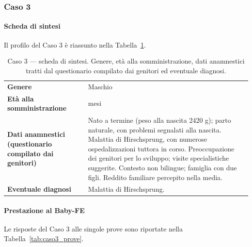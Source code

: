  \subsubsection*{Caso 3}

 \paragraph*{Scheda di sintesi}

Il profilo del Caso 3 è riassunto nella Tabella~\ref{tab:caso3_scheda}.

\begin{table}[htbp]
\centering
\caption[Caso 3 --- scheda di sintesi]{Caso 3 --- scheda di sintesi. Genere, età alla somministrazione, dati anamnestici tratti dal questionario compilato dai genitori ed eventuale diagnosi.}
\label{tab:caso3_scheda}
\begin{tabular}{|>{\raggedright\arraybackslash}p{4.3cm}|>{\raggedright\arraybackslash}p{9.2cm}|}
\toprule
\textbf{Genere} & Maschio \\
\textbf{Età alla somministrazione} & 31 mesi \\
\textbf{Dati anamnestici (questionario compilato dai genitori)} & Nato a termine (peso alla nascita 2420 g); parto naturale, con problemi segnalati alla nascita. Malattia di Hirschsprung, con numerose ospedalizzazioni tuttora in corso. Preoccupazione dei genitori per lo sviluppo; visite specialistiche suggerite. Contesto non bilingue; famiglia con due figli. Reddito familiare percepito nella media. \\
\textbf{Eventuale diagnosi} & Malattia di Hirschsprung. \\
\bottomrule
\end{tabular}
\end{table}

 \paragraph*{Prestazione al Baby-FE}

Le risposte del Caso 3 alle singole prove sono riportate nella Tabella~\ref{tab:caso3_prove}.


